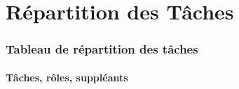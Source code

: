 \documentclass[
	article,			%
	11pt,				%
	oneside,			%
	a4paper,			%
	chapter=TITLE,
	french,			%
	sumario=tradicional
	]{base_nt}
\begin{document}

\frenchspacing 


%
%

\maketitle

\textual


\let\cleardoublepage\clearpage

\part{Répartition des Tâches}

\section{Tableau de répartition des tâches}

\subsection{Tâches, rôles, suppléants}
\end{document}

